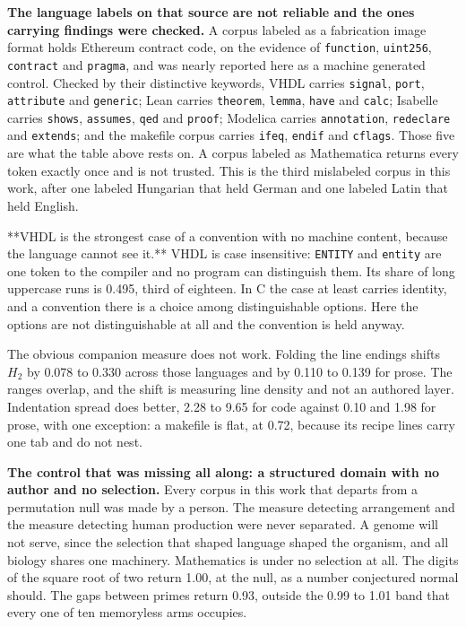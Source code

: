 \textbf{The language labels on that source are not reliable and the ones carrying findings were checked.} A corpus labeled as a fabrication image format holds Ethereum contract code, on the evidence of \texttt{function}, \texttt{uint256}, \texttt{contract} and \texttt{pragma}, and was nearly reported here as a machine generated control. Checked by their distinctive keywords, VHDL carries \texttt{signal}, \texttt{port}, \texttt{attribute} and \texttt{generic}; Lean carries \texttt{theorem}, \texttt{lemma}, \texttt{have} and \texttt{calc}; Isabelle carries \texttt{shows}, \texttt{assumes}, \texttt{qed} and \texttt{proof}; Modelica carries \texttt{annotation}, \texttt{redeclare} and \texttt{extends}; and the makefile corpus carries \texttt{ifeq}, \texttt{endif} and \texttt{cflags}. Those five are what the table above rests on. A corpus labeled as Mathematica returns every token exactly once and is not trusted. This is the third mislabeled corpus in this work, after one labeled Hungarian that held German and one labeled Latin that held English.

**VHDL is the strongest case of a convention with no machine content, because the language cannot see it.** VHDL is case insensitive: \texttt{ENTITY} and \texttt{entity} are one token to the compiler and no program can distinguish them. Its share of long uppercase runs is 0.495, third of eighteen. In C the case at least carries identity, and a convention there is a choice among distinguishable options. Here the options are not distinguishable at all and the convention is held anyway.

The obvious companion measure does not work. Folding the line endings shifts \(H_2\) by 0.078 to 0.330 across those languages and by 0.110 to 0.139 for prose. The ranges overlap, and the shift is measuring line density and not an authored layer. Indentation spread does better, 2.28 to 9.65 for code against 0.10 and 1.98 for prose, with one exception: a makefile is flat, at 0.72, because its recipe lines carry one tab and do not nest.

\textbf{The control that was missing all along: a structured domain with no author and no selection.} Every corpus in this work that departs from a permutation null was made by a person. The measure detecting arrangement and the measure detecting human production were never separated. A genome will not serve, since the selection that shaped language shaped the organism, and all biology shares one machinery. Mathematics is under no selection at all. The digits of the square root of two return 1.00, at the null, as a number conjectured normal should. The gaps between primes return 0.93, outside the 0.99 to 1.01 band that every one of ten memoryless arms occupies.

